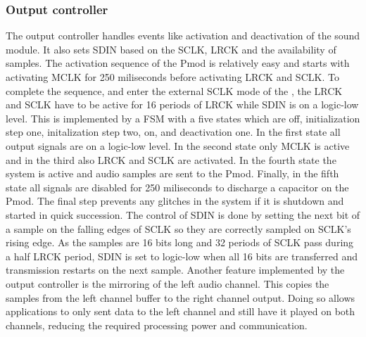 \subsubsection{Output controller}
The output controller handles events like activation and deactivation of the sound module. It also sets SDIN based on the SCLK, LRCK and the availability of samples. The activation sequence of the Pmod is relatively easy and starts with activating MCLK for 250 miliseconds before activating LRCK and SCLK. To complete the sequence, and enter the external SCLK mode of the \cs, the LRCK and SCLK have to be active for 16 periods of LRCK while SDIN is on a logic-low level. This is implemented by a FSM with a five states which are off, initialization step one, initalization step two, on, and deactivation one. In the first state all output signals are on a logic-low level. In the second state only MCLK is active and in the third also LRCK and SCLK are activated. In the fourth state the system is active and audio samples are sent to the Pmod. Finally, in the fifth state all signals are disabled for 250 miliseconds to discharge a capacitor on the Pmod. The final step prevents any glitches in the system if it is shutdown and started in quick succession. The control of SDIN is done by setting the next bit of a sample on the falling edges of SCLK so they are correctly sampled on SCLK's rising edge. As the samples are 16 bits long and 32 periods of SCLK pass during a half LRCK period, SDIN is set to logic-low when all 16 bits are transferred and transmission restarts on the next sample. Another feature implemented by the output controller is the mirroring of the left audio channel. This copies the samples from the left channel buffer to the right channel output. Doing so allows applications to only sent data to the left channel and still have it played on both channels, reducing the required processing power and communication.

